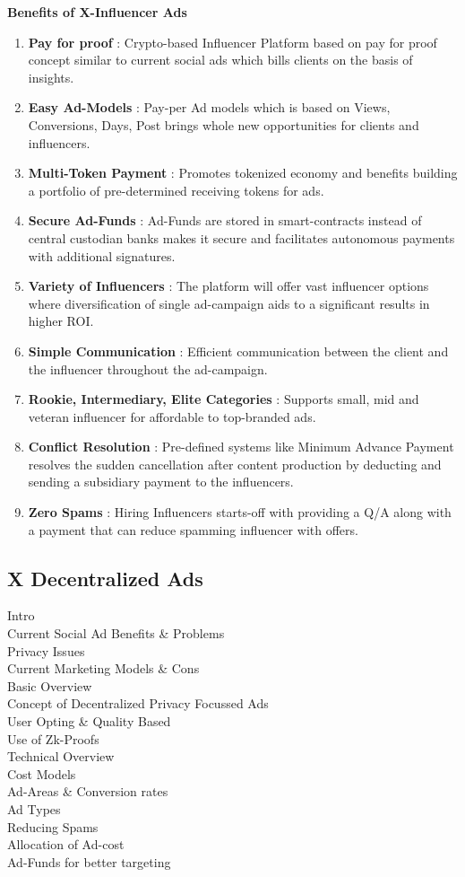 \documentclass[letterpaper,11pt]{article}
\begin{document}
\textbf{Benefits of X-Influencer Ads}
\begin{enumerate}[wide, labelwidth=!, labelindent=0pt]
\item \textbf{Pay for proof} : Crypto-based Influencer Platform based on pay for proof concept similar to current social ads which bills clients on the basis of insights.
\item \textbf{Easy Ad-Models} : Pay-per Ad models which is based on Views, Conversions, Days, Post brings whole new opportunities for clients and influencers.
\item \textbf{Multi-Token Payment} : Promotes tokenized economy and benefits building a portfolio of pre-determined receiving tokens for ads.
\item \textbf{Secure Ad-Funds} : Ad-Funds are stored in smart-contracts instead of central custodian banks makes it secure and facilitates autonomous payments with additional signatures.
\item \textbf{Variety of Influencers} : The platform will offer vast influencer options where diversification of single ad-campaign aids to a significant results in higher ROI.
\item \textbf{Simple Communication} : Efficient communication between the client and the influencer throughout the ad-campaign.
\item \textbf{Rookie, Intermediary, Elite Categories} : Supports small, mid and veteran influencer for affordable to top-branded ads.
\item \textbf{Conflict Resolution} : Pre-defined systems like Minimum Advance Payment resolves the sudden cancellation after content production by deducting and sending a subsidiary payment to the influencers.
\item \textbf{Zero Spams} : Hiring Influencers starts-off with providing a Q/A along with a payment that can reduce spamming influencer with offers.
\end{enumerate}
\subsection{\textbf{X Decentralized Ads}}

Intro\\
Current Social Ad Benefits \& Problems\\
Privacy Issues\\
Current Marketing Models \& Cons\\
Basic Overview\\
Concept of Decentralized Privacy Focussed Ads\\
User Opting \& Quality Based\\
Use of Zk-Proofs\\
Technical Overview\\
Cost Models\\
Ad-Areas \& Conversion rates\\
Ad Types\\
Reducing Spams\\
Allocation of Ad-cost\\
Ad-Funds for better targeting\\
\end{document}
